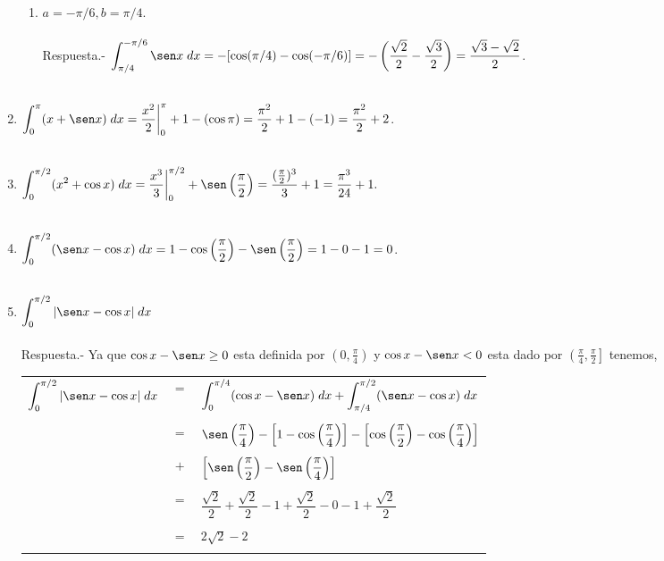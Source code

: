 \begin{enumerate}[\bfseries 1.]
\begin{enumerate}[\bfseries (a)]
	\item $a=-\pi/6,b=\pi/4$.\\\\
	    Respuesta.-\; $\displaystyle\int_{\pi/4}^{-\pi/6}\sen x \; dx = -[\cos(\pi/4) - \cos(-\pi/6)] = -\left(\dfrac{\sqrt{2}}{2}-\dfrac{\sqrt{3}}{2}\right) = \dfrac{\sqrt{3}-\sqrt{2}}{2}$.\\\\

    \end{enumerate}

\item $\displaystyle\int_{0}^\pi (x+\sen x)\; dx = \dfrac{x^2}{2}\bigg|_0^\pi + 1 - (\cos \pi) = \dfrac{\pi^2}{2}+1-(-1) = \dfrac{\pi^2}{2} + 2$.\\\\

\item $\displaystyle\int_{0}^{\pi/2} (x^2+\cos x)\; dx = \dfrac{x^3}{3}\bigg|_0^{\pi/2}+\sen\left(\dfrac{\pi}{2}\right) = \dfrac{(\frac{\pi}{2})^3}{3} + 1 = \dfrac{\pi^3}{24}+1.$\\\\

\item $\displaystyle\int_0^{\pi/2} (\sen x - \cos x)\; dx = 1-\cos \left(\dfrac{\pi}{2}\right) - \sen\left(\dfrac{\pi}{2}\right) = 1-0-1 = 0$.\\\\

\item $\displaystyle\int_0^{\pi/2} |\sen x - \cos x|\; dx$\\\\
    Respuesta.-\; Ya que $\cos x - \sen x \geq 0$ esta definida por $\left(0,\frac{\pi}{4}\right)$ y $\cos x - \sen x < 0$ esta dado por $\left(\frac{\pi}{4},\frac{\pi}{2}\right]$ tenemos,
    \begin{center}
	\begin{tabular}{rcl}
	    $\displaystyle\int_0^{\pi/2} |\sen x - \cos x|\; dx$&$=$&$\displaystyle\int_0^{\pi/4}(\cos x - \sen x)\; dx + \int_{\pi/4}^{\pi/2}(\sen x - \cos x)\; dx$\\\\
								&$=$&$\sen\left(\dfrac{\pi}{4}\right)-\left[1-\cos\left(\dfrac{\pi}{4}\right)\right]  -\left[\cos\left(\dfrac{\pi}{2}\right)-\cos\left(\dfrac{\pi}{4}\right)\right]$\\\\
								&$+$&$\left[\sen\left(\dfrac{\pi}{2}\right)-\sen \left(\dfrac{\pi}{4}\right)\right]$\\\\
								&$=$&$\dfrac{\sqrt{2}}{2}+\dfrac{\sqrt{2}}{2}-1+\dfrac{\sqrt{2}}{2}-0-1+\dfrac{\sqrt{2}}{2}$\\\\
	      &$=$&$2\sqrt{2}-2$\\\\
	  \end{tabular}
    \end{center}


\end{enumerate}
